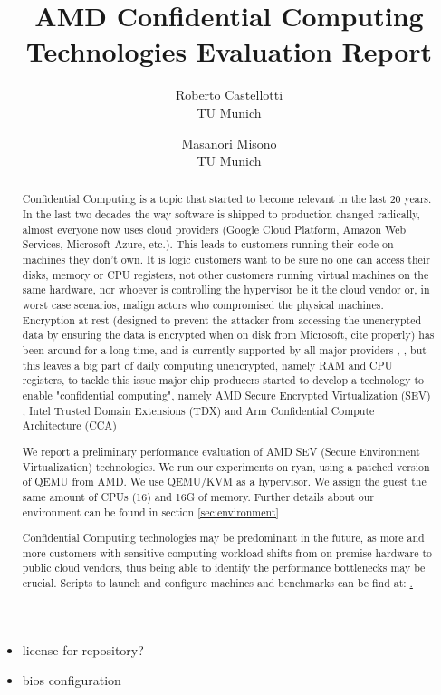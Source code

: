 \documentclass[twocolumn]{article}
\begin{document}
\date{}
\title{\Large \bf AMD Confidential Computing Technologies Evaluation Report}
\author{{\rm Roberto Castellotti}\\TU Munich \and {\rm Masanori Misono}\\TU Munich}
\maketitle

\begin{itemize}
    \item license for repository?
    \item bios configuration
\end{itemize}

\begin{abstract}
    Confidential Computing is a topic that started to become relevant in the last 20 years. In the last two decades the way software is shipped to production changed radically, almost everyone now uses cloud providers (Google Cloud Platform, Amazon Web Services, Microsoft Azure, etc.). This leads to customers running their code on machines they don't own. It is logic customers want to be sure no one can access their disks, memory or CPU registers, not other customers running virtual machines on the same hardware, nor whoever is controlling the hypervisor be it  the cloud vendor  or, in worst case scenarios, malign actors who compromised the physical machines. Encryption at rest (designed to prevent the attacker from accessing the unencrypted data by ensuring the data is encrypted when on disk from Microsoft, cite properly) has been around for a long time, and is currently supported by all major providers \cite{aws-enc}, \cite{gcp-enc}, \cite{azure-enc} but this leaves a big part of daily computing unencrypted, namely RAM and CPU registers, to tackle this issue major chip producers started to develop a technology to enable "confidential computing", 
    namely AMD Secure Encrypted Virtualization (SEV) \cite{memory-encryption}, Intel Trusted Domain Extensions (TDX) \cite{tdx} and Arm Confidential Compute Architecture (CCA) \cite{cca}

    We report a preliminary performance evaluation of AMD SEV (Secure Environment Virtualization) technologies.
    We run our experiments on ryan, using a patched version of QEMU from AMD. We use QEMU/KVM as a hypervisor. We assign the guest the same amount of CPUs (16) and 16G of memory. Further details about our environment can be found in section \ref{sec:environment}
    
    Confidential Computing technologies may be predominant in the future, as more and more customers with sensitive computing workload shifts from on-premise hardware to public cloud vendors, thus being able to identify the performance bottlenecks may be crucial. Scripts to launch and configure machines and benchmarks can be find at: \href{https://github.com/rcastellotti/gr}.  


\end{abstract}
\end{document}
